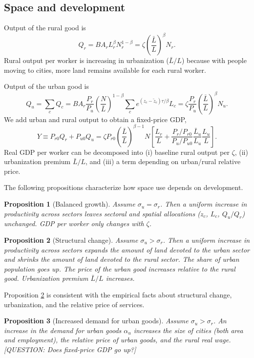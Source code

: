 \documentclass[12pt]{article}
\newtheorem{proposition}{Proposition}
\begin{document}
\subsection{Space and development}
Output of the rural good is
\[
Q_r = B A_r L_r^{\beta}N_r^{1-\beta}=
\zeta \left(\frac{\bar L}{L}\right)^\beta
{N_r}.
\]
Rural output per worker is increasing in urbanization ($\bar L/L$) because with people moving to cities, more land remains available for each rural worker.

Output of the urban good is
\[
Q_u = \sum_c Q_c
= B A_r \frac{P_r}{P_u}
\left(\frac {N}
	{{\bar L}}
\right)^{1-\beta}
\sum_c e^{(z_c-\tilde z_c)\tau/\beta} L_c=
\zeta\frac{P_r}{P_u}
\left(\frac{\bar L}{L}\right)^\beta
N_u.
\]
We add urban and rural output to obtain a fixed-price GDP,
\begin{equation}
	Y \equiv
	P_{r0}Q_r + P_{u0}Q_u
	=
	\zeta P_{r0} \left(\frac{\bar L}{L}\right)^{\beta-1} N
\left[
\frac {L_r}{L}
+
\frac{P_r/P_{r0}}{P_u/P_{u0}}
\frac {\bar L_u}{L_u}
\frac {L_u}{L}
\right].
\end{equation}
Real GDP per worker can be decomposed into (i) baseline rural output per $\zeta$, (ii) urbanization premium $\bar L/L$, and (iii) a term depending on urban/rural relative price.


The following propositions characterize how space use depends on development.
\begin{proposition}[Balanced growth]\label{prop:balanced_growth}
Assume $\sigma_u=\sigma_r$. Then a uniform increase in productivity across sectors leaves sectoral and spatial allocations ($z_c$, $L_c$, $Q_u/Q_r$) unchanged. GDP per worker only changes with $\zeta$.
\end{proposition}

\begin{proposition}[Structural change]\label{prop:comparative_static}
Assume $\sigma_u>\sigma_r$. Then a uniform increase in productivity across sectors expands the amount of land devoted to the urban sector and shrinks the amount of land devoted to the rural sector. The share of urban population goes up. The price of the urban good increases relative to the rural good. Urbanization premium $\bar L/L$ increases.
\end{proposition}

Proposition \ref{prop:comparative_static} is consistent with the empirical facts about structural change, urbanization, and the relative price of services.

\begin{proposition}[Increased demand for urban goods]\label{prop:demand}
Assume $\sigma_u>\sigma_r$. An increase in the demand for urban goods $\alpha_u$ increases the size of cities (both area and employment), the relative price of urban goods, and the rural real wage. [QUESTION: Does fixed-price GDP go up?]
\end{proposition}
\end{document}
